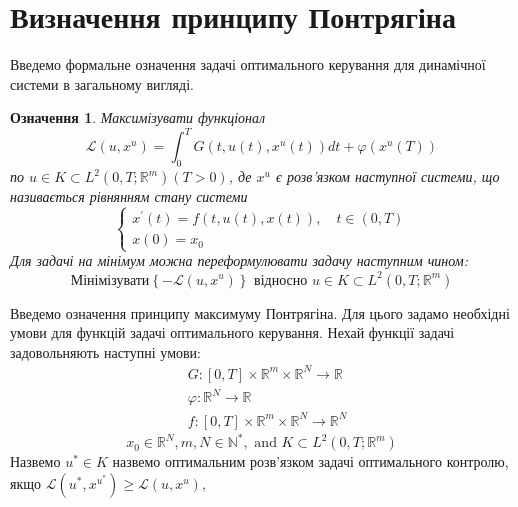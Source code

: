 \documentclass[a4paper,12pt]{extreport}
\newtheorem{corollary}{Означення}[theorem]
\begin{document}
\section{Визначення принципу Понтрягіна} 
Введемо формальне означення задачі оптимального керування для динамічної системи в загальному вигляді. 
    \begin{corollary}
    Максимізувати функціонал
    \begin{equation} \label{eq:2_1}
      \mathcal{L}\left(u, x^u\right)=\int_0^T G\left(t, u(t), x^u(t)\right) d t+\varphi\left(x^u(T)\right)
    \end{equation}   
    \newline по
    $u \in K \subset L^2\left(0, T ; \mathbb{R}^m\right)(T>0)$, де  $x^u$ є розв'язком наступної системи, що називається рівнянням стану системи
    \begin{equation} \label{eq:2_2}
        \left\{\begin{array}{l}
        x^{\prime}(t)=f(t, u(t), x(t)), \quad t \in(0, T) \\
        x(0)=x_0
        \end{array}\right.
    \end{equation}
    Для задачі на мінімум можна переформулювати задачу наступним чином:
    $$ \text{Мінімізувати}  \left\{-\mathcal{L}\left(u, x^u\right)\right\}
    \text { відносно } u \in K \subset L^2\left(0, T ; \mathbb{R}^m\right)$$
    \end{corollary} 
Введемо означення принципу максимуму Понтрягіна. Для цього задамо необхідні умови для функцій задачі оптимального керування.
Нехай функції задачі задовольняють наступні умови:
    $$
    \begin{aligned}
    &G:[0, T] \times \mathbb{R}^m \times \mathbb{R}^N \rightarrow \mathbb{R} \\
    &\varphi: \mathbb{R}^N \rightarrow \mathbb{R} \\
    &f:[0, T] \times \mathbb{R}^m \times \mathbb{R}^N \rightarrow \mathbb{R}^N
    \end{aligned}
    $$
$$
    x_0 \in \mathbb{R}^N, m, N \in \mathbb{N}^*, \text { and } K \subset L^2\left(0, T ; \mathbb{R}^m\right)
$$
    Назвемо $u^* \in K$ назвемо  оптимальним розв'язком задачі оптимального контролю, якщо
    $\mathcal{L}\left(u^*, x^{u^*}\right) \geq \mathcal{L}\left(u, x^u\right),$
\end{document}
